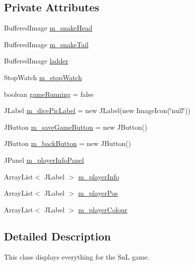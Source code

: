 \subsection*{Private Attributes}
\begin{DoxyCompactItemize}
\item 
Buffered\+Image \hyperlink{class_display_1_1_display_sn_l_ad8119225e6027adeced313ef342b67a2}{m\+\_\+snake\+Head}
\item 
Buffered\+Image \hyperlink{class_display_1_1_display_sn_l_a6821965beb6bde17ff10f6e3e09f3287}{m\+\_\+snake\+Tail}
\item 
Buffered\+Image \hyperlink{class_display_1_1_display_sn_l_a4f2e517153c6066a9ba3d627728ed51c}{ladder}
\item 
Stop\+Watch \hyperlink{class_display_1_1_display_sn_l_a4e69018d83aaba48baa701597a876bf6}{m\+\_\+stop\+Watch}
\item 
boolean \hyperlink{class_display_1_1_display_sn_l_a539641b8ae0dae1e3106d2f0717fe55d}{game\+Running} = false
\item 
J\+Label \hyperlink{class_display_1_1_display_sn_l_aafb6d505956de58bbd229a789342ef19}{m\+\_\+dice\+Pic\+Label} = new J\+Label(new Image\+Icon(\char`\"{}null\char`\"{}))
\item 
J\+Button \hyperlink{class_display_1_1_display_sn_l_a7ae26c71761566ba21e8eb4e4981969f}{m\+\_\+save\+Game\+Button} = new J\+Button()
\item 
J\+Button \hyperlink{class_display_1_1_display_sn_l_a9452f0a663eaea507cf3561851e5c74e}{m\+\_\+back\+Button} = new J\+Button()
\item 
J\+Panel \hyperlink{class_display_1_1_display_sn_l_a7afa5f7ca8e697b64de4de4246f2c2a8}{m\+\_\+player\+Info\+Panel}
\item 
Array\+List$<$ J\+Label $>$ \hyperlink{class_display_1_1_display_sn_l_ad4d75120b08606844b7fa63e2990928b}{m\+\_\+player\+Info}
\item 
Array\+List$<$ J\+Label $>$ \hyperlink{class_display_1_1_display_sn_l_aa4b30638e1d8f99b5052652ea02d6365}{m\+\_\+player\+Pos}
\item 
Array\+List$<$ J\+Label $>$ \hyperlink{class_display_1_1_display_sn_l_a075a16b363ea3d1e75e589fe11b2b0e7}{m\+\_\+player\+Colour}
\end{DoxyCompactItemize}


\subsection{Detailed Description}
This class displays everything for the Sn\+L game. 

